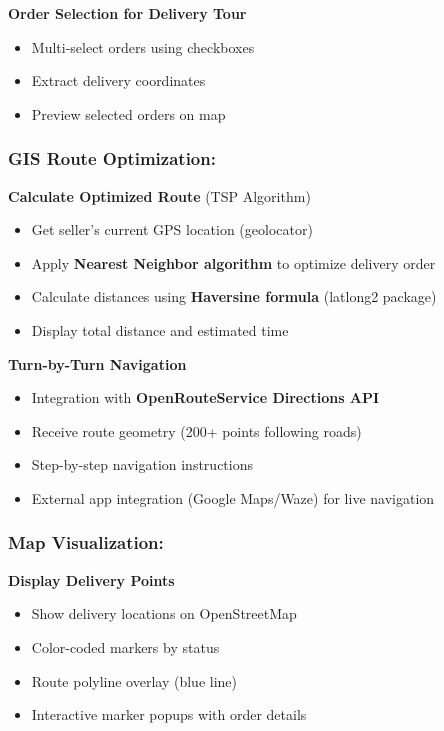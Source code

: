 \documentclass[12pt,a4paper]{article}
\begin{document}
\textbf{Order Selection for Delivery Tour}
\begin{itemize}
    \item Multi-select orders using checkboxes
    \item Extract delivery coordinates
    \item Preview selected orders on map
\end{itemize}

\subsubsection{GIS Route Optimization:}

\textbf{Calculate Optimized Route} (TSP Algorithm)
\begin{itemize}
    \item Get seller's current GPS location (geolocator)
    \item Apply \textbf{Nearest Neighbor algorithm} to optimize delivery order
    \item Calculate distances using \textbf{Haversine formula} (latlong2 package)
    \item Display total distance and estimated time
\end{itemize}

\textbf{Turn-by-Turn Navigation}
\begin{itemize}
    \item Integration with \textbf{OpenRouteService Directions API}
    \item Receive route geometry (200+ points following roads)
    \item Step-by-step navigation instructions
    \item External app integration (Google Maps/Waze) for live navigation
\end{itemize}

\subsubsection{Map Visualization:}

\textbf{Display Delivery Points}
\begin{itemize}
    \item Show delivery locations on OpenStreetMap
    \item Color-coded markers by status
    \item Route polyline overlay (blue line)
    \item Interactive marker popups with order details
\end{itemize}
\end{document}
